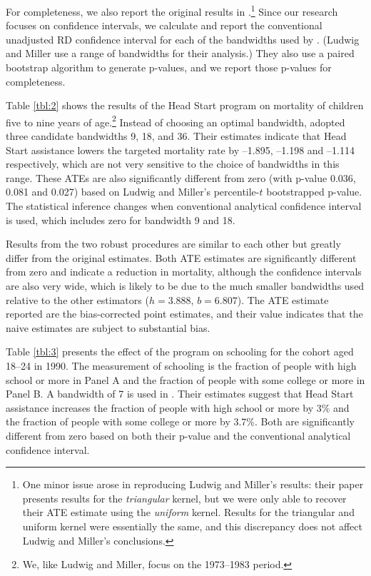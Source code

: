 \documentclass[12pt,fleqn]{article}
\begin{document}
For completeness, we also report the
original results in \cite{ludwig2007}.\footnote{%
  One minor issue arose in reproducing Ludwig and Miller's results: their paper
  presents results for the \emph{triangular} kernel, but we were only able to
  recover their ATE estimate using the \emph{uniform} kernel. Results for the
  triangular and uniform kernel were essentially the same, and this discrepancy
  does not affect Ludwig and Miller's conclusions.} %
Since our research focuses on confidence intervals, we calculate and report
the conventional unadjusted RD confidence interval for each of the bandwidths
used by \cite{ludwig2007}. (Ludwig and Miller use a range of bandwidths
for their analysis.) They also use a paired bootstrap algorithm to generate
p-values, and we report those p-values for completeness.

Table \ref{tbl:2} shows the results of the Head Start program on mortality of
children five to nine years of age.\footnote{%
  We, like Ludwig and Miller, focus on the 1973--1983 period.} %
Instead of choosing an optimal bandwidth, \cite{ludwig2007} adopted three
candidate bandwidths 9, 18, and 36. Their estimates indicate that Head Start
assistance lowers the targeted mortality rate by --1.895, --1.198 and --1.114
respectively, which are not very sensitive to the choice of bandwidths in this
range. These ATEs are also significantly different from zero (with p-value
0.036, 0.081 and 0.027) based on Ludwig and Miller's percentile-$t$ bootstrapped
p-value. The statistical inference changes when conventional analytical
confidence interval is used, which includes zero for bandwidth 9 and 18.

Results from the two robust procedures are similar to each other but greatly
differ from the original estimates. Both ATE estimates are significantly different from
zero and indicate a reduction in mortality, although the confidence intervals are
also very wide, which is likely to be
due to the much smaller bandwidths used relative to the other estimators
($h=3.888$, $b=6.807$). The ATE estimate reported are the bias-corrected
point estimates, and their value indicates that the naive estimates are
subject to substantial bias.

Table \ref{tbl:3} presents the effect of the program on schooling for the cohort
aged 18--24 in 1990. The measurement of schooling is the fraction of people with
high school or more in Panel A and the fraction of people with some college or
more in Panel B. A bandwidth of 7 is used in \cite{ludwig2007}. Their estimates
suggest that Head Start assistance increases the fraction of people with high
school or more by 3\% and the fraction of people with some college or more by
3.7\%. Both are significantly different from zero based on both their p-value
and the conventional analytical confidence interval.
\end{document}
